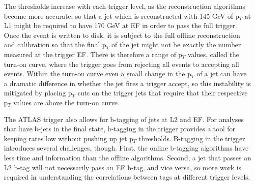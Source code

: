 The thresholds increase with each trigger level, as the reconstruction algorithms become more accurate, so that a jet which is reconstructed with 145 GeV of p$_T$ at L1 might be required to have 170 GeV at EF in order to pass the full trigger.  Once the event is written to disk, it is subject to the full offline reconstruction and calibration so that the final p$_T$ of the jet might not be exactly the number measured at the trigger EF.  There is therefore a range of p$_T$ values, called the turn-on curve, where the trigger goes from rejecting all events to accepting all events.  Within the turn-on curve even a small change in the p$_T$ of a jet can have a dramatic difference in whether the jet fires a trigger accept, so this instability is mitigated by placing p$_T$ cuts on the trigger jets that require that their respective p$_T$ values are above the turn-on curve.  

The ATLAS trigger also allows for b-tagging of jets at L2 and EF.  For analyses that have b-jets in the final state, b-tagging in the trigger provides a tool for keeping rates low without pushing up jet p$_T$ thresholds.  B-tagging in the trigger introduces several challenges, though.  First, the online b-tagging algorithms have less time and information than the offline algorithms.  Second, a jet that passes an L2 b-tag will not necessarily pass an EF b-tag, and vice versa, so more work is required in understanding the correlations between tags at different trigger levels.  







